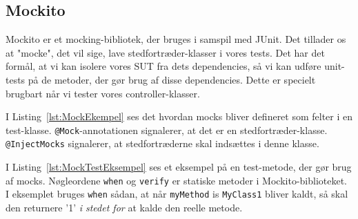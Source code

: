 
\subsection{Mockito}
Mockito \cite{Mockito} er et mocking-bibliotek, der bruges i samspil med JUnit. Det tillader os at "mocke", det vil sige, lave stedfortræder-klasser i vores tests. Det har det formål, at vi kan isolere vores SUT fra dets dependencies, så vi kan udføre unit-tests på de metoder, der gør brug af disse dependencies. Dette er specielt brugbart når vi tester vores controller-klasser.

I Listing~\ref{lst:MockEkempel} ses det hvordan mocks bliver defineret som felter i en test-klasse. \texttt{@Mock}-annotationen signalerer, at det er en stedfortræder-klasse. \texttt{@InjectMocks} signalerer, at stedfortræderne skal indsættes i denne klasse.

I Listing~\ref{lst:MockTestEksempel} ses et eksempel på en test-metode, der gør brug af mocks. Nøgleordene \texttt{when} og \texttt{verify} er statiske metoder i Mockito-biblioteket. I eksemplet bruges \texttt{when} sådan, at når \texttt{myMethod} is \texttt{MyClass1} bliver kaldt, så skal den returnere '1' \textit{i stedet for} at kalde den reelle metode. 



